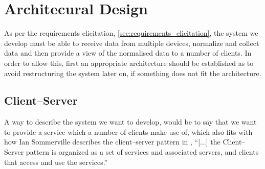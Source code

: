 





\section{Architecural Design}\label{sec:architectural_design}
As per the requirements elicitation, \cref{sec:requirements_elicitation}, the system we develop must be able to receive data from multiple devices, normalize and collect data and then provide a view of the normalised data to a number of clients.
In order to allow this, first an appropriate architecture should be established as to avoid restructuring the system later on, if something does not fit the architecture.

\subsection{Client--Server}
A way to describe the system we want to develop, would be to say that we want to provide a service which a number of clients make use of, which also fits with how Ian Sommerville describes the client--server pattern in \cite{software_engineering},
``[...] the Client--Server pattern is organized as a set of services and associated servers, and clients that access and use the services.''


